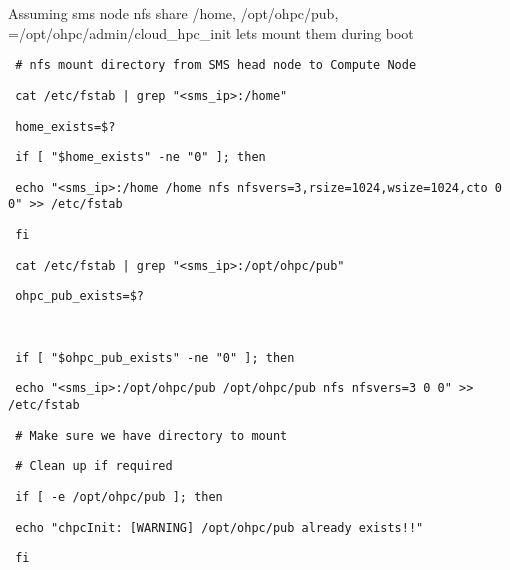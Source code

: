 \begin{section}
Assuming sms node nfs share /home, /opt/ohpc/pub, =/opt/ohpc/admin/cloud\_hpc\_init lets mount them during boot

\begin{bash}\texttt{\small{ \# nfs mount directory from SMS head node to Compute Node}}\end{bash}
\begin{bash}\texttt{\small{ cat /etc/fstab | grep "<sms\_ip>:/home"}}\end{bash}
\begin{bash}\texttt{\small{ home\_exists=\$?}}\end{bash}
\begin{bash}\texttt{\small{ if [ "\${home\_exists}" -ne "0" ]; then}}\end{bash}
\begin{bash}\texttt{\small{     echo "<sms\_ip>:/home /home nfs nfsvers=3,rsize=1024,wsize=1024,cto 0 0" >> /etc/fstab}}\end{bash}
\begin{bash}\texttt{\small{ fi}}\end{bash}
\begin{bash}\texttt{\small{ cat /etc/fstab | grep "<sms\_ip>:/opt/ohpc/pub"}}\end{bash}
\begin{bash}\texttt{\small{ ohpc\_pub\_exists=\$?}}\end{bash}
\begin{bash}\texttt{\small{ }}\end{bash}
\begin{bash}\texttt{\small{ if [ "\${ohpc\_pub\_exists}" -ne "0" ]; then}}\end{bash}
\begin{bash}\texttt{\small{     echo "<sms\_ip>:/opt/ohpc/pub /opt/ohpc/pub nfs nfsvers=3 0 0" >> /etc/fstab}}\end{bash}
\begin{bash}\texttt{\small{     \# Make sure we have directory to mount}}\end{bash}
\begin{bash}\texttt{\small{     \# Clean up if required}}\end{bash}
\begin{bash}\texttt{\small{     if [ -e /opt/ohpc/pub ]; then}}\end{bash}
\begin{bash}\texttt{\small{         echo "chpcInit: [WARNING] /opt/ohpc/pub already exists!!"}}\end{bash}
\begin{bash}\texttt{\small{     fi}}\end{bash}

\end{section}
